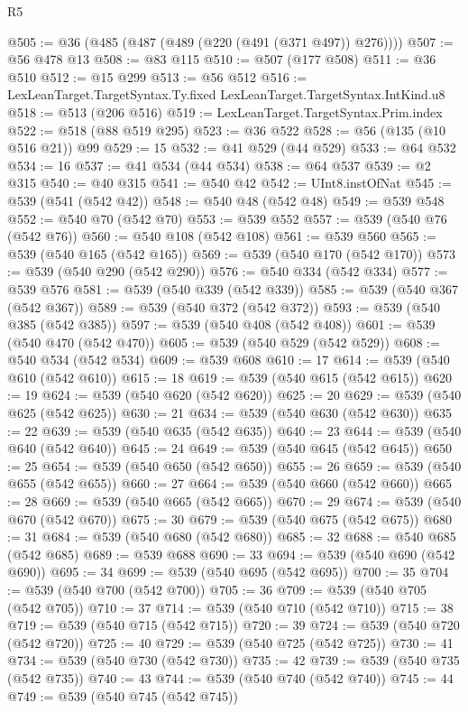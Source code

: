 \begin{lexlean}{R5}
\begin{coremodule}
@505 := @36 (@485 (@487 (@489 (@220 (@491 (@371 @497)) @276))))
@507 := @56 @478 @13
@508 := @83 @115
@510 := @507 (@177 @508)
@511 := @36 @510
@512 := @15 @299
@513 := @56 @512
@516 := LexLeanTarget.TargetSyntax.Ty.fixed LexLeanTarget.TargetSyntax.IntKind.u8
@518 := @513 (@206 @516)
@519 := LexLeanTarget.TargetSyntax.Prim.index
@522 := @518 (@88 @519 @295)
@523 := @36 @522
@528 := @56 (@135 (@10 @516 @21)) @99
@529 := 15
@532 := @41 @529 (@44 @529)
@533 := @64 @532
@534 := 16
@537 := @41 @534 (@44 @534)
@538 := @64 @537
@539 := @2 @315
@540 := @40 @315
@541 := @540 @42
@542 := UInt8.instOfNat
@545 := @539 (@541 (@542 @42))
@548 := @540 @48 (@542 @48)
@549 := @539 @548
@552 := @540 @70 (@542 @70)
@553 := @539 @552
@557 := @539 (@540 @76 (@542 @76))
@560 := @540 @108 (@542 @108)
@561 := @539 @560
@565 := @539 (@540 @165 (@542 @165))
@569 := @539 (@540 @170 (@542 @170))
@573 := @539 (@540 @290 (@542 @290))
@576 := @540 @334 (@542 @334)
@577 := @539 @576
@581 := @539 (@540 @339 (@542 @339))
@585 := @539 (@540 @367 (@542 @367))
@589 := @539 (@540 @372 (@542 @372))
@593 := @539 (@540 @385 (@542 @385))
@597 := @539 (@540 @408 (@542 @408))
@601 := @539 (@540 @470 (@542 @470))
@605 := @539 (@540 @529 (@542 @529))
@608 := @540 @534 (@542 @534)
@609 := @539 @608
@610 := 17
@614 := @539 (@540 @610 (@542 @610))
@615 := 18
@619 := @539 (@540 @615 (@542 @615))
@620 := 19
@624 := @539 (@540 @620 (@542 @620))
@625 := 20
@629 := @539 (@540 @625 (@542 @625))
@630 := 21
@634 := @539 (@540 @630 (@542 @630))
@635 := 22
@639 := @539 (@540 @635 (@542 @635))
@640 := 23
@644 := @539 (@540 @640 (@542 @640))
@645 := 24
@649 := @539 (@540 @645 (@542 @645))
@650 := 25
@654 := @539 (@540 @650 (@542 @650))
@655 := 26
@659 := @539 (@540 @655 (@542 @655))
@660 := 27
@664 := @539 (@540 @660 (@542 @660))
@665 := 28
@669 := @539 (@540 @665 (@542 @665))
@670 := 29
@674 := @539 (@540 @670 (@542 @670))
@675 := 30
@679 := @539 (@540 @675 (@542 @675))
@680 := 31
@684 := @539 (@540 @680 (@542 @680))
@685 := 32
@688 := @540 @685 (@542 @685)
@689 := @539 @688
@690 := 33
@694 := @539 (@540 @690 (@542 @690))
@695 := 34
@699 := @539 (@540 @695 (@542 @695))
@700 := 35
@704 := @539 (@540 @700 (@542 @700))
@705 := 36
@709 := @539 (@540 @705 (@542 @705))
@710 := 37
@714 := @539 (@540 @710 (@542 @710))
@715 := 38
@719 := @539 (@540 @715 (@542 @715))
@720 := 39
@724 := @539 (@540 @720 (@542 @720))
@725 := 40
@729 := @539 (@540 @725 (@542 @725))
@730 := 41
@734 := @539 (@540 @730 (@542 @730))
@735 := 42
@739 := @539 (@540 @735 (@542 @735))
@740 := 43
@744 := @539 (@540 @740 (@542 @740))
@745 := 44
@749 := @539 (@540 @745 (@542 @745))

\end{coremodule}
\end{lexlean}
